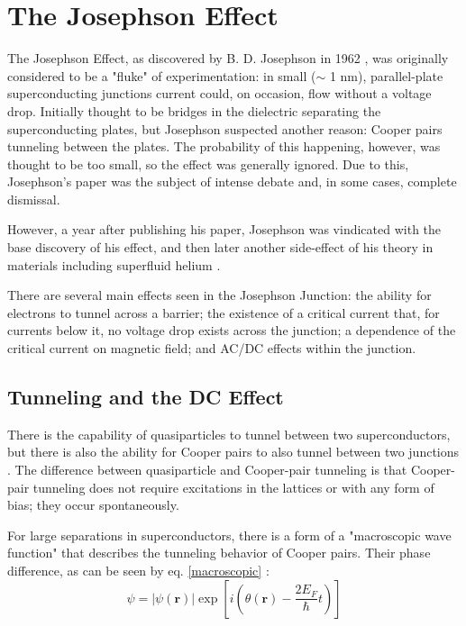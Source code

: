 \documentclass[letterpaper,english,reprint, aps]{revtex4-1}
\begin{document}
\section{The Josephson Effect}
The Josephson Effect, as discovered by B. D. Josephson in 1962 \citep{josephson, josephson_ieee}, was originally considered to be a "fluke" of experimentation: in small ($\sim$ 1 nm), parallel-plate superconducting junctions current could, on occasion, flow without a voltage drop. Initially thought to be bridges in the dielectric separating the superconducting plates, but Josephson suspected another reason: Cooper pairs tunneling between the plates. The probability of this happening, however, was thought to be too small, so the effect was generally ignored. Due to this, Josephson's paper was the subject of intense debate and, in some cases, complete dismissal.

However, a year after publishing his paper, Josephson was vindicated with the base discovery of his effect, and then later another side-effect of his theory in materials including superfluid helium \citep{josephson_ieee, probable_jj, AC_He_jj, AC_detect}.

There are several main effects seen in the Josephson Junction: the ability for electrons to tunnel across a barrier; the existence of a critical current that, for currents below it, no voltage drop exists across the junction; a dependence of the critical current on magnetic field; and AC/DC effects within the junction.

\subsection{Tunneling and the DC Effect}
There is the capability of quasiparticles to tunnel between two superconductors, but there is also the ability for Cooper pairs to also tunnel between two junctions \citep{josephson, vanduzer}. The difference between quasiparticle and Cooper-pair tunneling is that Cooper-pair tunneling does not require excitations in the lattices or with any form of bias; they occur spontaneously.

For large separations in superconductors, there is a form of a "macroscopic wave function" that describes the tunneling behavior of Cooper pairs. Their phase difference, as can be seen by eq. \ref{macroscopic} \citep{vanduzer}:
\begin{equation}
    \label{macroscopic}
    \psi = |\psi (\boldsymbol{r})|\exp\left[i\left(\theta(\boldsymbol{r}) - \frac{2E_F}{\hbar}t\right)\right]
\end{equation}
\end{document}

